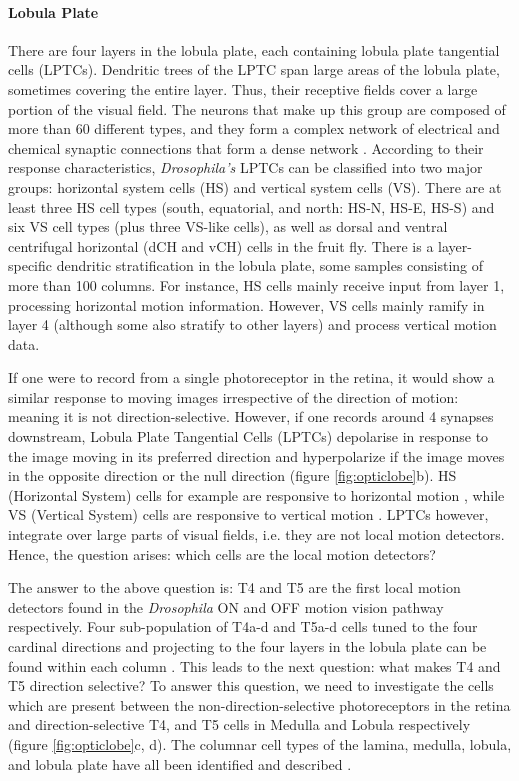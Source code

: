 \paragraph{Lobula Plate}
There are four layers in the lobula plate, each containing lobula plate tangential cells (LPTCs). Dendritic trees of the LPTC span large areas of the lobula plate, sometimes covering the entire layer. Thus, their receptive fields cover a large portion of the visual field. The neurons that make up this group are composed of more than 60 different types, and they form a complex network of electrical and chemical synaptic connections that form a dense network \parencite{Borst2010}. According to their response characteristics, \textit{Drosophila's} LPTCs can be classified into two major groups: horizontal system cells (HS) and vertical system cells (VS). There are at least three HS cell types (south, equatorial, and north: HS-N, HS-E, HS-S) and six VS cell types (plus three VS-like cells), as well as dorsal and ventral centrifugal horizontal (dCH and vCH) cells in the fruit fly. There is a layer-specific dendritic stratification in the lobula plate, some samples consisting of more than 100 columns. For instance, HS cells mainly receive input from layer 1, processing horizontal motion information. However, VS cells mainly ramify in layer 4 (although some also stratify to other layers) and process vertical motion data.

If one were to record from a single photoreceptor in the retina, it would show a similar response to moving images irrespective of the direction of motion: meaning it is not direction-selective. However, if one records around 4 synapses downstream, Lobula Plate Tangential Cells (LPTCs) depolarise in response to the image moving in its preferred direction and hyperpolarize if the image moves in the opposite direction or the null direction (figure \ref{fig:opticlobe}b). HS (Horizontal System) cells for example are responsive to horizontal motion \parencite{Schnell2010}, while VS (Vertical System) cells are responsive to vertical motion \parencite{Joesch2008}. LPTCs however, integrate over large parts of visual fields, i.e. they are not local motion detectors. Hence, the question arises: which cells are the local motion detectors? 

The answer to the above question is: T4 and T5 are the first local motion detectors found in the \textit{Drosophila} ON and OFF motion vision pathway respectively. Four sub-population of T4a-d and T5a-d cells tuned to the four cardinal directions and projecting to the four layers in the lobula plate can be found within each column \parencite{Maisak2013}. This leads to the next question: what makes T4 and T5 direction selective? To answer this question, we need to investigate the cells which are present between the non-direction-selective photoreceptors in the retina and direction-selective T4, and T5 cells in Medulla and Lobula respectively (figure \ref{fig:opticlobe}c, d). The columnar cell types of the lamina, medulla, lobula, and lobula plate have all been identified and described \parencite{Fischbach1989, RamonyCajal1915}.  

